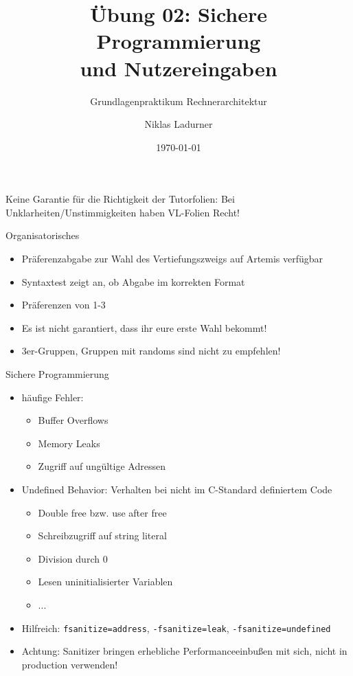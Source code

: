 \documentclass[
  german,            %
  aspectratio=169,    %
]{tumbeamer}
\title{Übung 02: Sichere Programmierung\\ und Nutzereingaben}
\subtitle{Grundlagenpraktikum Rechnerarchitektur}
\author{Niklas Ladurner}
\institute{\theChairName\\\theDepartmentName\\\theUniversityName}
\date[\today]{\today}
\begin{document}
\maketitle

\begin{frame}[c]{}{}
  \begin{center}
    \LARGE  Keine Garantie für die Richtigkeit der Tutorfolien: Bei Unklarheiten/Unstimmigkeiten
    haben VL-Folien Recht!
  \end{center}
\end{frame}

\begin{frame}[c]{Organisatorisches}{}
  \begin{itemize}
    \item Präferenzabgabe zur Wahl des Vertiefungszweigs auf Artemis verfügbar
    \item Syntaxtest zeigt an, ob Abgabe im korrekten Format
    \item Präferenzen von 1-3
    \item Es ist nicht garantiert, dass ihr eure erste Wahl bekommt!
    \item 3er-Gruppen, Gruppen mit randoms sind nicht zu empfehlen!
  \end{itemize}
\end{frame}


\begin{frame}[c, fragile]{Sichere Programmierung}{}
  \begin{itemize}
    \item häufige Fehler:
    \begin{itemize}
      \item Buffer Overflows
      \item Memory Leaks
      \item Zugriff auf ungültige Adressen  
    \end{itemize}
    \item Undefined Behavior: Verhalten bei nicht im C-Standard definiertem Code
    \begin{itemize}
      \item Double free bzw. use after free
      \item Schreibzugriff auf string literal
      \item Division durch 0
      \item Lesen uninitialisierter Variablen
      \item ...
    \end{itemize}
    \item Hilfreich: \verb|fsanitize=address|, \verb|-fsanitize=leak|, \verb|-fsanitize=undefined|
    \item Achtung: Sanitizer bringen erhebliche Performanceeinbußen mit sich, nicht in production verwenden!
  \end{itemize}
\end{frame}
\end{document}
